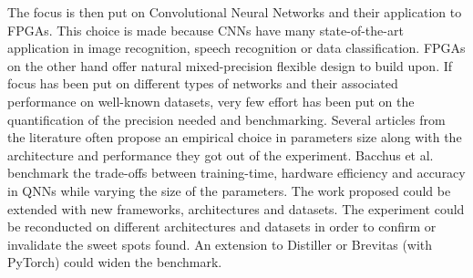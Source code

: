The focus is then put on Convolutional Neural Networks and their application to FPGAs. This choice is made because CNNs have many state-of-the-art application in image recognition, speech recognition or data classification. FPGAs on the other hand offer natural mixed-precision flexible design to build upon. If focus has been put on different types of networks and their associated performance on well-known datasets, very few effort \cite{Bacchus2020} has been put on the quantification of the precision needed and benchmarking. Several articles from the literature often propose an empirical choice in parameters size along with the architecture and performance they got out of the experiment. Bacchus et al. \cite{Bacchus2020} benchmark the trade-offs between training-time, hardware efficiency and accuracy in QNNs while varying the size of the parameters. The work proposed could be extended with new frameworks, architectures and  datasets. The experiment could be reconducted on different architectures and datasets in order to confirm or invalidate the sweet spots found. An extension to Distiller or Brevitas (with PyTorch) could widen the benchmark.
